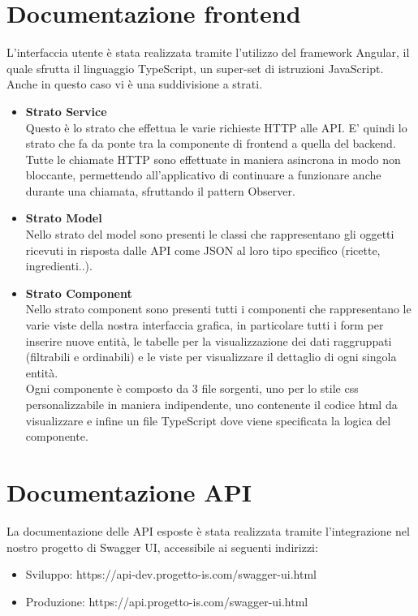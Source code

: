 \documentclass{article}
\begin{document}
\section{Documentazione frontend}
L’interfaccia utente è stata realizzata tramite l’utilizzo del framework Angular, il quale sfrutta il linguaggio TypeScript, un super-set di istruzioni JavaScript. Anche in questo caso vi è una suddivisione a strati.
\begin{itemize}
    \item \textbf{Strato Service}\\
Questo è lo strato che effettua le varie richieste HTTP alle API. E' quindi lo strato che fa da ponte tra la componente di frontend a quella del backend.\\
Tutte le chiamate HTTP sono effettuate in maniera asincrona in modo non bloccante, permettendo all’applicativo di continuare a funzionare anche durante una chiamata, sfruttando il pattern Observer.
\item \textbf{Strato Model}\\
Nello strato del model sono presenti le classi che rappresentano gli oggetti ricevuti in risposta dalle API come JSON al loro tipo specifico (ricette, ingredienti..).
\item \textbf{Strato Component}\\
Nello strato component sono presenti tutti i componenti che rappresentano le varie viste della nostra interfaccia grafica, in particolare tutti i form per inserire nuove entità, le tabelle per la visualizzazione dei dati raggruppati (filtrabili e ordinabili) e le viste per visualizzare il dettaglio di ogni singola entità.\\
Ogni componente è composto da 3 file sorgenti, uno per lo stile css personalizzabile in maniera indipendente, uno contenente il codice html da visualizzare e infine un file TypeScript dove viene specificata la logica del componente.
\end{itemize}
\section{Documentazione API}
La documentazione delle API esposte è stata realizzata tramite l’integrazione nel nostro progetto di Swagger UI, accessibile ai seguenti indirizzi:
\begin{itemize}
    \item Sviluppo: https://api-dev.progetto-is.com/swagger-ui.html
    \item Produzione: https://api.progetto-is.com/swagger-ui.html
\end{itemize}
\clearpage
\end{document}
